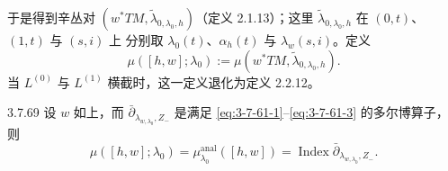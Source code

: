 于是得到辛丛对
$(w^*TM,\widetilde\lambda_{0,\lambda_0,h})$（定义 2.1.13）；这里
$\widetilde\lambda_{0,\lambda_0,h}$ 在 $(0,t)$、$(1,t)$ 与 $(s,i)$ 上
分别取 $\lambda_0(t)$、$\alpha_h(t)$ 与 $\lambda_w(s,i)$。定义
\begin{equation}
 \mu([h,w];\lambda_0)
 :=
 \mu(w^*TM,\widetilde\lambda_{0,\lambda_0,h}).
\tag{3.7.68}\label{eq:3-7-68}
\end{equation}
当 $L^{(0)}$ 与 $L^{(1)}$ 横截时，这一定义退化为定义 2.2.12。

\begin{lemma}{3.7.69}\label{lem:3-7-69}
设 $w$ 如上，而
$\bar\partial_{\lambda_{w,\lambda_0},Z_-}$ 是满足
\eqref{eq:3-7-61-1}--\eqref{eq:3-7-61-3} 的多尔博算子，则
\[
 \mu([h,w];\lambda_0)
 =
 \mu_{\lambda_0}^{\mathrm{anal}}([h,w])
 =
 \operatorname{Index}\bar\partial_{\lambda_{w,\lambda_0},Z_-}.
\]
\end{lemma}

